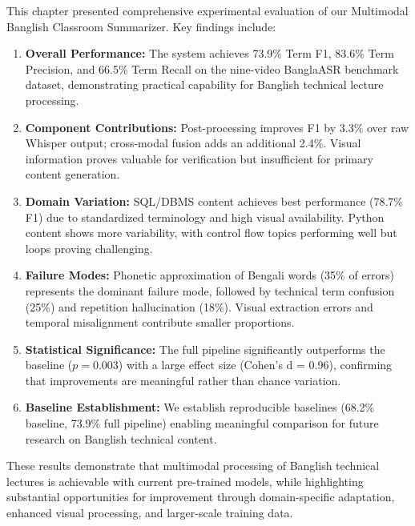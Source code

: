 This chapter presented comprehensive experimental evaluation of our Multimodal Banglish Classroom Summarizer. Key findings include:

\begin{enumerate}
    \item \textbf{Overall Performance:} The system achieves 73.9\% Term F1, 83.6\% Term Precision, and 66.5\% Term Recall on the nine-video BanglaASR benchmark dataset, demonstrating practical capability for Banglish technical lecture processing.
    
    \item \textbf{Component Contributions:} Post-processing improves F1 by 3.3\% over raw Whisper output; cross-modal fusion adds an additional 2.4\%. Visual information proves valuable for verification but insufficient for primary content generation.
    
    \item \textbf{Domain Variation:} SQL/DBMS content achieves best performance (78.7\% F1) due to standardized terminology and high visual availability. Python content shows more variability, with control flow topics performing well but loops proving challenging.
    
    \item \textbf{Failure Modes:} Phonetic approximation of Bengali words (35\% of errors) represents the dominant failure mode, followed by technical term confusion (25\%) and repetition hallucination (18\%). Visual extraction errors and temporal misalignment contribute smaller proportions.
    
    \item \textbf{Statistical Significance:} The full pipeline significantly outperforms the baseline ($p = 0.003$) with a large effect size (Cohen's d = 0.96), confirming that improvements are meaningful rather than chance variation.
    
    \item \textbf{Baseline Establishment:} We establish reproducible baselines (68.2\% baseline, 73.9\% full pipeline) enabling meaningful comparison for future research on Banglish technical content.
\end{enumerate}

These results demonstrate that multimodal processing of Banglish technical lectures is achievable with current pre-trained models, while highlighting substantial opportunities for improvement through domain-specific adaptation, enhanced visual processing, and larger-scale training data.

